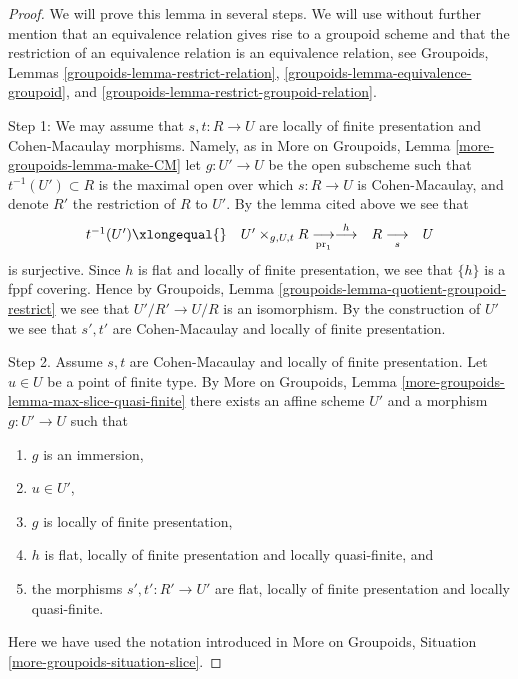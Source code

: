 \begin{proof}
We will prove this lemma in several steps. We will use without further
mention that an equivalence relation gives rise to a groupoid scheme
and that the restriction of an equivalence relation is an equivalence
relation, see
Groupoids, Lemmas
\ref{groupoids-lemma-restrict-relation},
\ref{groupoids-lemma-equivalence-groupoid}, and
\ref{groupoids-lemma-restrict-groupoid-relation}.

\medskip\noindent
Step 1: We may assume that $s, t : R \to U$ are locally of finite presentation
and Cohen-Macaulay morphisms. Namely, as in
More on Groupoids, Lemma \ref{more-groupoids-lemma-make-CM}
let $g : U' \to U$ be the open subscheme such that
$t^{-1}(U') \subset R$ is the maximal open over which $s : R \to U$ is
Cohen-Macaulay, and denote $R'$ the restriction of $R$ to $U'$.
By the lemma cited above we see that
$$
\begin{array}{cccc}t^{-1}(U') \xlongequal{} & U' \times_{g, U, t} R \underset{\text{pr}_1}{\longrightarrow}\overset{h}{\longrightarrow} & R \underset{s}{\longrightarrow} & U\end{array}
$$
is surjective. Since $h$ is flat and locally of finite presentation, we
see that $\{h\}$ is a fppf covering. Hence by
Groupoids, Lemma \ref{groupoids-lemma-quotient-groupoid-restrict}
we see that $U'/R' \to U/R$ is an isomorphism. By the construction of $U'$
we see that $s', t'$ are Cohen-Macaulay and locally of finite presentation.

\medskip\noindent
Step 2. Assume $s, t$ are Cohen-Macaulay and locally of finite presentation.
Let $u \in U$ be a point of finite type. By
More on Groupoids, Lemma \ref{more-groupoids-lemma-max-slice-quasi-finite}
there exists an affine scheme $U'$ and a morphism $g : U' \to U$ such that
\begin{enumerate}
\item $g$ is an immersion,
\item $u \in U'$,
\item $g$ is locally of finite presentation,
\item $h$ is flat, locally of finite presentation and locally quasi-finite, and
\item the morphisms $s', t' : R' \to U'$ are flat, locally of finite
presentation and locally quasi-finite.
\end{enumerate}
Here we have used the notation introduced in
More on Groupoids, Situation \ref{more-groupoids-situation-slice}.


\end{proof}
